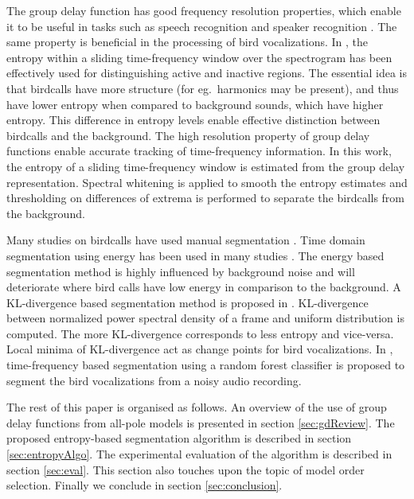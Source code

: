 \documentclass[a4paper]{article}
\begin{document}
The group delay function has good frequency resolution properties, which enable
it to be useful in tasks such as speech recognition and speaker recognition
\cite{hema} \cite{padman} \cite{modgdf}. The same property is beneficial in the
processing of bird vocalizations. In \cite{wang2013}, the entropy within a
sliding time-frequency window over the spectrogram has been effectively used for
distinguishing active and inactive regions. The essential idea is that birdcalls
have more structure (for eg.~harmonics may be present), and thus have lower
entropy when compared to background sounds, which have higher entropy. This
difference in entropy levels enable effective distinction between birdcalls and
the background.
The high resolution property of group delay functions enable accurate tracking
of time-frequency information. In this work, the entropy of a sliding
time-frequency window is estimated from the group delay representation. Spectral
whitening is applied to smooth the entropy estimates and thresholding on
differences of extrema is performed to separate the birdcalls from the
background.

Many studies on birdcalls have used manual segmentation \cite{Trifa} \cite{Lee}
\cite{Kaewtip}. Time domain segmentation using energy has been used in many
studies \cite{Harma} \cite{Somervuo} \cite{Fagerlund} . The energy  based
segmentation method is highly influenced by background noise and will
deteriorate  where bird calls have low energy in comparison to the background. A
KL-divergence based segmentation method is proposed in \cite{Lakshmi}.
KL-divergence between normalized power spectral density of a frame and uniform
distribution is computed. The more KL-divergence corresponds to less entropy and
vice-versa. Local minima of KL-divergence act as change points for bird
vocalizations. In \cite{Neal}, time-frequency based segmentation using a random
forest classifier is proposed to  segment the bird vocalizations from a noisy
audio recording.

The rest of this paper is organised as follows. An overview of the use of group
delay functions from all-pole models is presented in section \ref{sec:gdReview}.
The proposed entropy-based segmentation algorithm is described in section
\ref{sec:entropyAlgo}. The experimental evaluation of the algorithm is described
in section \ref{sec:eval}. This section also touches upon the topic of model
order selection. Finally we conclude in section \ref{sec:conclusion}.
\end{document}
